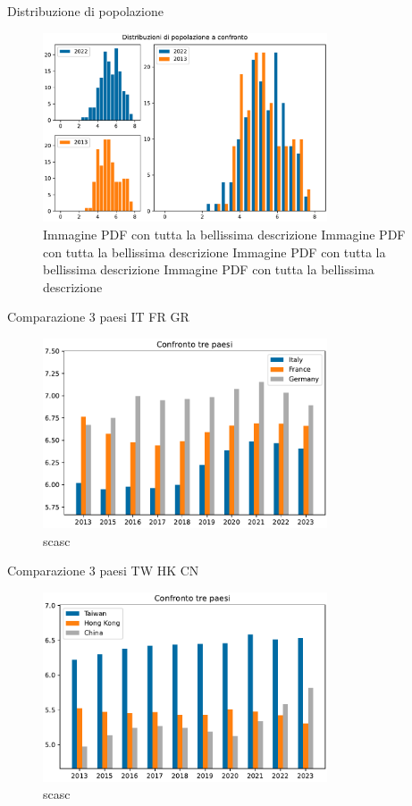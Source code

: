 \documentclass{beamer}
\begin{document}
\begin{frame}{Distribuzione di popolazione}
	\begin{figure}
		\centering
		\includegraphics[width=0.75\textwidth]{"./img/2DistribuzioniPopolazioni.pdf"}
		\caption{Immagine PDF con tutta la bellissima descrizione Immagine PDF con tutta la bellissima descrizione Immagine PDF con tutta la bellissima descrizione Immagine PDF con tutta la bellissima descrizione }
		\label{fig:pdf}
	\end{figure}
\end{frame}

\begin{frame}{Comparazione 3 paesi IT FR GR}
	\begin{figure}
		\centering
		\includegraphics[width=0.75\textwidth]{"./img/3ComparoPaesi_Italy_France_Germany.pdf"}
		\caption{scasc}
	\end{figure}
\end{frame}

\begin{frame}{Comparazione 3 paesi TW HK CN}
	\begin{figure}
		\centering
		\includegraphics[width=0.75\textwidth]{"./img/3ComparoPaesi_Taiwan_HongKong_China.pdf"}
		\caption{scasc}
	\end{figure}
\end{frame}
\end{document}
